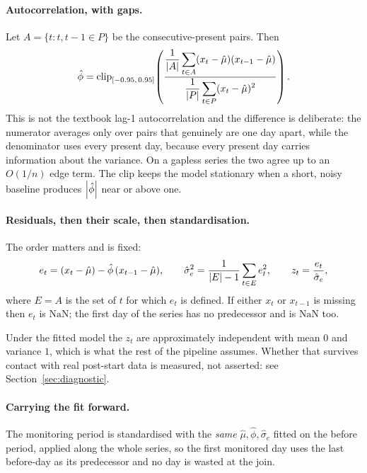 \documentclass{article}
\theoremstyle{plain}
\theoremstyle{definition}
\theoremstyle{remark}
\numberwithin{equation}{section}
\begin{document}
\paragraph{Autocorrelation, with gaps.} Let
$A = \{t : t, t-1 \in P\}$ be the consecutive-present pairs. Then
\begin{equation}
\label{eq:phi}
  \hat\phi = \mathrm{clip}_{[-0.95,\,0.95]}\!
  \left(
  \frac{\displaystyle\frac{1}{\abs{A}}\sum_{t \in A}(x_t-\hat\mu)(x_{t-1}-\hat\mu)}
       {\displaystyle\frac{1}{\abs{P}}\sum_{t\in P}(x_t-\hat\mu)^2}
  \right).
\end{equation}
This is not the textbook lag-1 autocorrelation and the difference is
deliberate: the numerator averages only over pairs that genuinely are one day
apart, while the denominator uses every present day, because every present day
carries information about the variance. On a gapless series the two agree up
to an $O(1/n)$ edge term. The clip keeps the model stationary when a short,
noisy baseline produces $\abs{\hat\phi}$ near or above one.

\paragraph{Residuals, then their scale, then standardisation.} The order
matters and is fixed:
\begin{equation}
\label{eq:resid}
  e_t = (x_t - \hat\mu) - \hat\phi\,(x_{t-1}-\hat\mu),
  \qquad
  \hat\sigma_e^2 = \frac{1}{\abs{E}-1}\sum_{t \in E} e_t^2,
  \qquad
  z_t = \frac{e_t}{\hat\sigma_e},
\end{equation}
where $E = A$ is the set of $t$ for which $e_t$ is defined. If either $x_t$ or
$x_{t-1}$ is missing then $e_t$ is $\mathrm{NaN}$; the first day of the series
has no predecessor and is $\mathrm{NaN}$ too.

Under the fitted model the $z_t$ are approximately independent with mean $0$
and variance $1$, which is what the rest of the pipeline assumes. Whether that
survives contact with real post-start data is measured, not asserted: see
Section~\ref{sec:diagnostic}.

\paragraph{Carrying the fit forward.} The monitoring period is standardised
with the \emph{same} $\hat\mu, \hat\phi, \hat\sigma_e$ fitted on the before
period, applied along the whole series, so the first monitored day uses the
last before-day as its predecessor and no day is wasted at the join.
\end{document}
